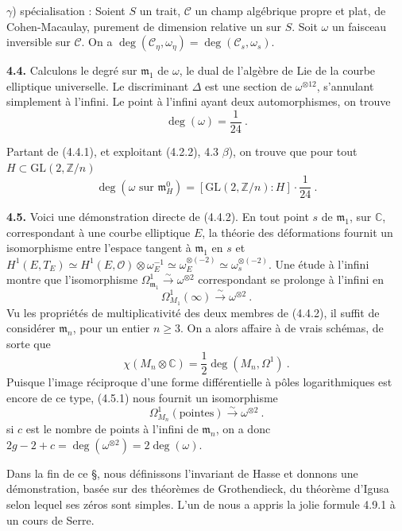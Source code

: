 \documentclass[10pt,a4paper]{amsart}
\theoremstyle{plain}
\theoremstyle{definition}
\renewcommand{\deg}{\operatorname{deg}}
\newcommand{\m}{\mathfrak{m}}
\newcommand{\cC}{\mathcal{C}}
\newcommand{\ZZ}{\mathbb{Z}}
\newcommand{\CC}{\mathbb{C}}
\newcommand{\GL}{\mathrm{GL}}
\begin{document}
$\gamma$) sp\'ecialisation : Soient $S$ un trait, $\cC$ un champ alg\'ebrique propre et plat, de Cohen-Macaulay, purement de dimension relative un sur $S$. Soit $\omega$ un faisceau inversible sur $\cC$. On a $\deg(\cC_\eta, \omega_\eta) = \deg(\cC_s, \omega_s)$.

\medskip\noindent\textbf{4.4.} Calculons le degr\'e sur $\m_1$ de $\omega$, le dual de l'alg\`ebre de Lie de la courbe elliptique universelle. Le discriminant $\Delta$ est une section de $\omega^{\otimes 12}$, s'annulant simplement \`a l'infini. Le point \`a l'infini ayant deux automorphismes, on trouve
\begin{equation}
\deg(\omega) = \frac{1}{24}\ .
\end{equation}

Partant de (4.4.1), et exploitant (4.2.2), 4.3 $\beta$), on trouve que pour tout $H \subset \GL(2,\ZZ/n)$
\begin{equation}
\deg(\omega \text{ sur } \m_H^0) = [\GL(2,\ZZ/n) : H] \cdot \frac{1}{24}\ .
\end{equation}

\medskip\noindent\textbf{4.5.} Voici une d\'emonstration directe de (4.4.2). En tout point $s$ de $\m_1$, sur $\CC$, correspondant \`a une courbe elliptique $E$, la th\'eorie des d\'eformations fournit un isomorphisme entre l'espace tangent \`a $\m_1$ en $s$ et $H^1(E, T_E) \simeq H^1(E, \mathcal{O}) \otimes \omega_E^{-1} \simeq \omega_E^{\otimes(-2)} \simeq \omega_s^{\otimes(-2)}$. Une \'etude \`a l'infini montre que l'isomorphisme $\Omega^1_{\m_1} \xrightarrow{\sim} \omega^{\otimes 2}$ correspondant se prolonge \`a l'infini en
\begin{equation}
\Omega^1_{M_1}(\infty) \xrightarrow{\sim} \omega^{\otimes 2}\ .
\end{equation}
Vu les propri\'et\'es de multiplicativit\'e des deux membres de (4.4.2), il suffit de consid\'erer $\m_n$, pour un entier $n \geq 3$. On a alors affaire \`a de vrais sch\'emas, de sorte que
\[
\chi(M_n \otimes \CC) = \frac{1}{2} \deg(M_n, \Omega^1)\ .
\]
Puisque l'image r\'eciproque d'une forme diff\'erentielle \`a p\^oles logarithmiques est encore de ce type, (4.5.1) nous fournit un isomorphisme
\begin{equation}
\Omega^1_{M_n}(\text{pointes}) \xrightarrow{\sim} \omega^{\otimes 2}\ .
\end{equation}
si $c$ est le nombre de points \`a l'infini de $\m_n$, on a donc $2g - 2 + c = \deg(\omega^{\otimes 2}) = 2\deg(\omega)$.

Dans la fin de ce \S, nous d\'efinissons l'invariant de Hasse et donnons une d\'emonstration, bas\'ee sur des th\'eor\`emes de Grothendieck, du th\'eor\`eme d'Igusa selon lequel ses z\'eros sont simples. L'un de nous a appris la jolie formule 4.9.1 \`a un cours de Serre.
\end{document}
